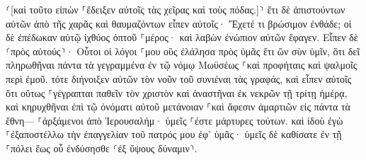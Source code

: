 \documentclass{openreader}
\begin{document}
⸂[καὶ τοῦτο εἰπὼν ⸀ἔδειξεν αὐτοῖς τὰς χεῖρας καὶ τοὺς πόδας.]⸃ 
ἔτι δὲ ἀπιστούντων αὐτῶν ἀπὸ τῆς χαρᾶς καὶ θαυμαζόντων εἶπεν αὐτοῖς· Ἔχετέ τι βρώσιμον ἐνθάδε; 
οἱ δὲ ἐπέδωκαν αὐτῷ ἰχθύος ὀπτοῦ ⸀μέρος· 
καὶ λαβὼν ἐνώπιον αὐτῶν ἔφαγεν. 
Εἶπεν δὲ ⸂πρὸς αὐτούς⸃· Οὗτοι οἱ λόγοι ⸀μου οὓς ἐλάλησα πρὸς ὑμᾶς ἔτι ὢν σὺν ὑμῖν, ὅτι δεῖ πληρωθῆναι πάντα τὰ γεγραμμένα ἐν τῷ νόμῳ Μωϋσέως ⸀καὶ προφήταις καὶ ψαλμοῖς περὶ ἐμοῦ. 
τότε διήνοιξεν αὐτῶν τὸν νοῦν τοῦ συνιέναι τὰς γραφάς, 
καὶ εἶπεν αὐτοῖς ὅτι οὕτως ⸀γέγραπται παθεῖν τὸν χριστὸν καὶ ἀναστῆναι ἐκ νεκρῶν τῇ τρίτῃ ἡμέρᾳ, 
καὶ κηρυχθῆναι ἐπὶ τῷ ὀνόματι αὐτοῦ μετάνοιαν ⸀καὶ ἄφεσιν ἁμαρτιῶν εἰς πάντα τὰ ἔθνη— ⸀ἀρξάμενοι ἀπὸ Ἰερουσαλήμ· 
ὑμεῖς ⸀ἐστε μάρτυρες τούτων. 
καὶ ἰδοὺ ἐγὼ ⸀ἐξαποστέλλω τὴν ἐπαγγελίαν τοῦ πατρός μου ἐφ’ ὑμᾶς· ὑμεῖς δὲ καθίσατε ἐν τῇ ⸀πόλει ἕως οὗ ἐνδύσησθε ⸂ἐξ ὕψους δύναμιν⸃. 
\end{document}
